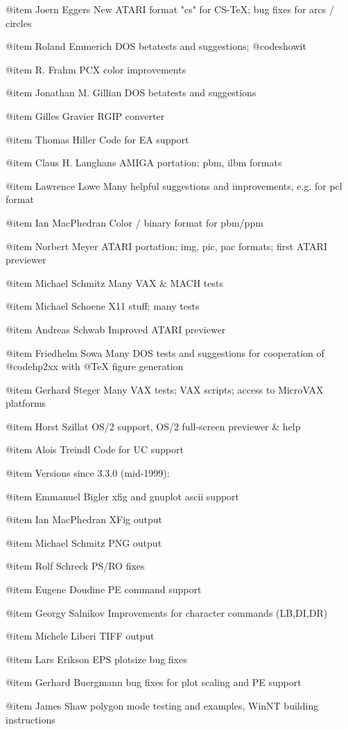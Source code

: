 @item Joern Eggers
New ATARI format "cs" for CS-TeX; bug fixes for arcs / circles

@item Roland Emmerich
DOS betatests and suggestions; @code{showit}

@item R. Frahm
PCX color improvements

@item Jonathan M. Gillian
DOS betatests and suggestions

@item Gilles Gravier
RGIP converter

@item Thomas Hiller
Code for EA support

@item Claus H. Langhans
AMIGA portation; pbm, ilbm formats

@item Lawrence Lowe
Many helpful suggestions and improvements, e.g. for pcl format

@item Ian MacPhedran
Color / binary format for pbm/ppm

@item Norbert Meyer
ATARI portation; img, pic, pac formats; first ATARI previewer

@item Michael Schmitz
Many VAX & MACH tests

@item Michael Schoene
X11 stuff; many tests

@item Andreas Schwab
Improved ATARI previewer

@item Friedhelm Sowa
Many DOS tests and suggestions for cooperation of @code{hp2xx} with
@TeX{} figure generation

@item Gerhard Steger
Many VAX tests; VAX scripts; access to MicroVAX platforms

@item Horst Szillat
OS/2 support, OS/2 full-screen previewer & help

@item Alois Treindl
Code for UC support


@item Versions since 3.3.0 (mid-1999):

@item Emmanuel Bigler
xfig and gnuplot ascii support

@item Ian MacPhedran
XFig output

@item Michael Schmitz
PNG output

@item Rolf Schreck
PS/RO fixes

@item Eugene Doudine
PE command support

@item Georgy Salnikov 
Improvements for character commands (LB,DI,DR)

@item Michele Liberi
TIFF output

@item Lars Erikson
EPS plotsize bug fixes

@item Gerhard Buergmann
bug fixes for plot scaling and PE support

@item James Shaw
polygon mode testing and examples, 
WinNT building instructions

